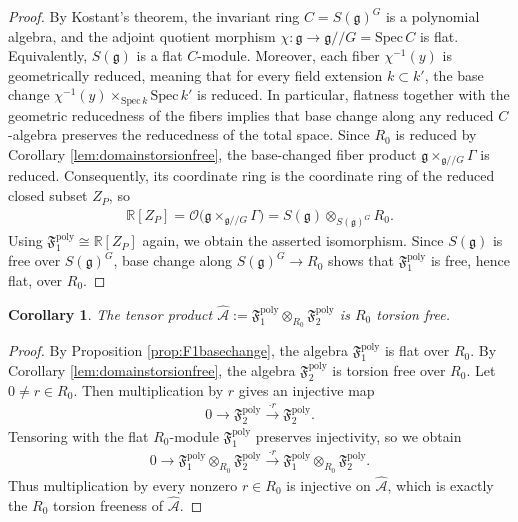 \documentclass[11pt]{amsart}
\theoremstyle{definition}
\theoremstyle{plain}
\newtheorem{corollary}[theorem]{Corollary}
\theoremstyle{conclusion}
\begin{document}
\begin{proof}
By Kostant's theorem, the invariant ring $C=S(\mathfrak{g})^G$ is a polynomial algebra, and the adjoint quotient morphism $\chi:\mathfrak{g}\to \mathfrak{g}//G= \mathrm{Spec} \, C$ is flat. Equivalently, $S(\mathfrak{g})$ is a flat $C$-module. Moreover, each fiber $\chi^{-1}(y)$ is geometrically reduced, meaning that for every field extension $k\subset k'$, the base change $\chi^{-1}(y)\times_{\mathrm{Spec} \, k}\mathrm{Spec} \, k'$ is reduced. In particular, flatness together with the geometric reducedness of the fibers implies that base change along any reduced $C$-algebra preserves the reducedness of the total space. Since $R_0$ is reduced by Corollary \ref{lem:domainstorsionfree}, the base-changed fiber product $\mathfrak{g}\times_{\mathfrak{g}//G}\Gamma$ is reduced. Consequently, its coordinate ring is the coordinate ring of the reduced closed subset $Z_P$, so \begin{align*}
\mathbb{R}[Z_P]=\mathcal{O}\big(\mathfrak{g}\times_{\mathfrak{g}//G}\Gamma\big)=S(\mathfrak{g})\otimes_{S(\mathfrak{g})^G}R_0.
\end{align*}
Using $\mathfrak{F}_1^{\mathrm{poly}}\cong \mathbb{R}[Z_P]$ again, we obtain the asserted isomorphism. Since $S(\mathfrak{g})$ is free over $S(\mathfrak{g})^G$, base change along $S(\mathfrak{g})^G\to R_0$ shows that $\mathfrak{F}_1^{\mathrm{poly}}$ is free, hence flat, over $R_0$.
\end{proof}

\begin{corollary}
\label{cor:widehatAtofree}
The tensor product $\widehat{\mathcal{A}}:=\mathfrak{F}_1^{\mathrm{poly}}\otimes_{R_0}\mathfrak{F}_2^{\mathrm{poly}}$ is $R_0$ torsion free.
\end{corollary}

\begin{proof}
By Proposition \ref{prop:F1basechange}, the algebra $\mathfrak{F}_1^{\mathrm{poly}}$ is flat over $R_0$. By Corollary \ref{lem:domainstorsionfree}, the algebra $\mathfrak{F}_2^{\mathrm{poly}}$ is torsion free over $R_0$. Let $0\neq r\in R_0$. Then multiplication by $r$ gives an injective map
\begin{align*}
0\longrightarrow \mathfrak{F}_2^{\mathrm{poly}}\xrightarrow{\cdot r}\mathfrak{F}_2^{\mathrm{poly}}.
\end{align*}
Tensoring with the flat $R_0$-module $\mathfrak{F}_1^{\mathrm{poly}}$ preserves injectivity, so we obtain
\begin{align*}
0\longrightarrow \mathfrak{F}_1^{\mathrm{poly}}\otimes_{R_0}\mathfrak{F}_2^{\mathrm{poly}}\xrightarrow{\cdot r}\mathfrak{F}_1^{\mathrm{poly}}\otimes_{R_0}\mathfrak{F}_2^{\mathrm{poly}}.
\end{align*}
Thus multiplication by every nonzero $r\in R_0$ is injective on $\widehat{\mathcal{A}}$, which is exactly the $R_0$ torsion freeness of $\widehat{\mathcal{A}}$.
\end{proof}
\end{document}
